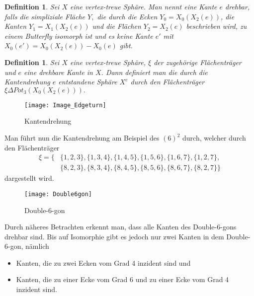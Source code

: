 \documentclass[12pt,titlepage,twoside,cleardoublepage]{article}
\theoremstyle{nummermitklammern}
\newtheorem{definition}[temp]{Definition}
\newtheorem{definition}[zahl]{Definition}
\numberwithin{equation}{section}
\begin{document}
\begin{definition}
Sei $X$ eine vertex-treue Sphäre. Man nennt eine Kante $e$ \emph{drehbar}, falls die simpliziale Fläche $Y,$ die durch die Ecken $Y_0= X_0(X_2(e))$, die Kanten $Y_1= X_1(X_2(e))$ und die Flächen $Y_2=X_2(e)$ beschrieben wird, zu einem Butterfly isomorph ist und es keine Kante $e'$ mit $X_0(e')=X_0(X_2(e))-X_0(e)$ gibt.
\end{definition}
\begin{definition}
Sei $X$ eine vertex-treue Sphäre, $\xi$ der zugehörige Flächenträger und $e$ eine drehbare Kante in $X$. Dann definiert man die durch die Kantendrehung $e$ entstandene Sphäre $X^e$ durch den Flächenträger $\xi \Delta Pot_3(X_0(X_2(e))).$
\end{definition}
\begin{figure}[H]
\begin{center}
\texttt{[image: Image\_Edgeturn]}
\end{center}
\caption{Kantendrehung}
\end{figure}
 Man führt nun die Kantendrehung am Beispiel des $(6)^2$  durch, welcher durch den Flächenträger
\begin{align*}
\xi=\{&\{1,2,3\},\{1,3,4\},\{1,4,5\},\{1,5,6\},\{1,6,7\},\{1,2,7\},\\ 
&\{8,2,3\},\{8,3,4\},\{8,4,5\},\{8,5,6\},\{8,6,7\},\{8,2,7\}\}
\end{align*}
dargestellt wird. 
\begin{figure}[H]
\begin{center}
\texttt{[image: Double6gon]}
\end{center}
\caption{Double-6-gon }
\end{figure}
Durch näheres Betrachten erkennt man, dass alle Kanten des Double-6-gons drehbar sind. Bis auf Isomorphie gibt es jedoch nur zwei Kanten in dem Double-6-gon, nämlich 
\begin{itemize}
\item Kanten, die zu zwei Ecken vom Grad 4 inzident sind und
\item Kanten, die zu einer Ecke vom Grad 6 und zu einer Ecke vom Grad 4 inzident sind.
\end{itemize}
\end{document}
